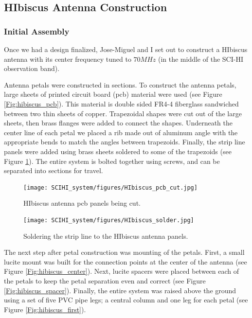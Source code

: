 \subsection{HIbiscus Antenna Construction}

\subsubsection{Initial Assembly}

Once we had a design finalized, Jose-Miguel and I set out to construct a HIbiscus antenna with its center frequency tuned to $70 MHz$ (in the middle of the SCI-HI observation band).

Antenna petals were constructed in sections. To construct the antenna petals, large sheets of printed circuit board (pcb) material were used (see Figure \ref{Fig:hibiscus_pcb}). This material is double sided FR4-4 fiberglass sandwiched between two thin sheets of copper. Trapezoidal shapes were cut out of the large sheets, then brass flanges were added to connect the shapes. Underneath the center line of each petal we placed a rib made out of aluminum angle with the appropriate bends to match the angles between trapezoids. Finally, the strip line panels were added using brass sheets soldered to some of the trapezoids (see Figure \ref{Fig:hibiscus_solder}). The entire system is bolted together using screws, and can be separated into sections for travel. 

\begin{figure}[htb]
\centering
\begin{minipage}[b]{0.39\textwidth}
\centering
\texttt{[image: SCIHI\_system/figures/HIbiscus\_pcb\_cut.jpg]}
\caption{HIbiscus antenna pcb panels being cut. }
\label{Fig:hibiscus_pcb}
\end{minipage}%
\begin{minipage}[b]{0.02\textwidth}
\hspace{1cm}
\end{minipage}%
\begin{minipage}[b]{0.55\textwidth}
\centering
\texttt{[image: SCIHI\_system/figures/HIbiscus\_solder.jpg]}
\caption{Soldering the strip line to the HIbiscus antenna panels.}
\label{Fig:hibiscus_solder}
\end{minipage}
\end{figure} 

The next step after petal construction was mounting of the petals. First, a small lucite mount was built for the connection points at the center of the antenna (see Figure \ref{Fig:hibiscus_center}). Next, lucite spacers were placed between each of the petals to keep the petal separation even and correct (see Figure \ref{Fig:hibiscus_spacer}). Finally, the entire system was raised above the ground using a set of five PVC pipe legs; a central column and one leg for each petal (see Figure \ref{Fig:hibiscus_first}). 

